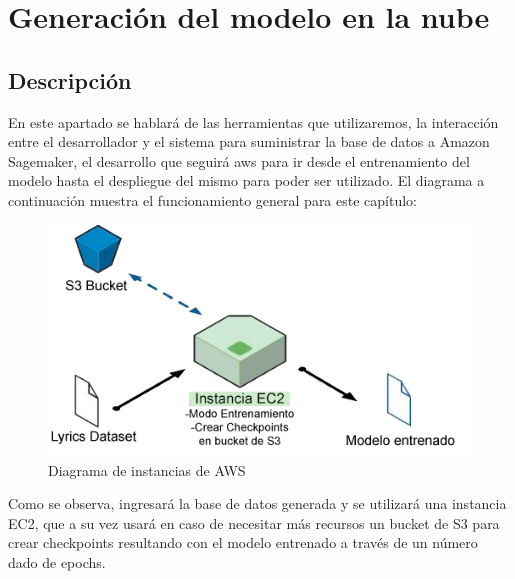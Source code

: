 \documentclass[12pt, a4paper, titlepage]{report}
\begin{document}
		\newpage
	
	\section{Generación del modelo en la nube} %
	\subsection{Descripción}
	
	En este apartado se hablará de las herramientas que utilizaremos, la interacción entre el desarrollador y el sistema para suministrar la base de datos a Amazon Sagemaker, el desarrollo que seguirá \acrshort{aws} para ir desde el entrenamiento del modelo hasta el despliegue del mismo para poder ser utilizado.
	El diagrama a continuación muestra el funcionamiento general para este capítulo:
	\begin{figure}[H] 
		\includegraphics[scale=.75]{./imagenes/Disenio/Arquitectura/Instancias.png}
		\caption{Diagrama de instancias de AWS}
	\end{figure}
	Como se observa, ingresará la base de datos generada y se utilizará una instancia EC2, que a su vez usará en caso de necesitar más recursos un bucket de S3 para crear checkpoints resultando con el modelo entrenado a través de un número dado de epochs.
\end{document}
